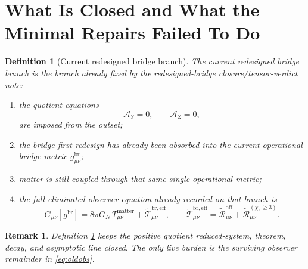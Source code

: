 \documentclass[11pt]{article}
\newcommand{\ReBridge}{g^{\mathrm{br}}}
\newcommand{\ReEff}{\widetilde{\mathcal T}_{\mu\nu}^{\mathrm{br,eff}}}
\newcommand{\ReLong}{\widetilde{\mathcal R}_{\mu\nu}^{(\chi,\ge 3)}}
\newcommand{\ReOff}{\widetilde{\mathcal R}_{\mu\nu}^{\mathrm{off}}}
\newcommand{\AY}{\mathcal A_Y}
\newcommand{\AZ}{\mathcal A_Z}
\newtheorem{definition}{Definition}
\newtheorem{remark}{Remark}
\begin{document}
\section{What Is Closed and What the Minimal Repairs Failed To Do}

\begin{definition}[Current redesigned bridge branch]
\label{def:current}
The \emph{current redesigned bridge branch} is the branch already fixed by the redesigned-bridge closure/tensor-verdict note:
\begin{enumerate}
    \item the quotient equations
    \begin{equation}
    \AY=0,
    \qquad
    \AZ=0,
    \label{eq:AYAZ}
    \end{equation}
    are imposed from the outset;
    \item the bridge-first redesign has already been absorbed into the current operational bridge metric \(\ReBridge_{\mu\nu}\);
    \item matter is still coupled through that same single operational metric;
    \item the full eliminated observer equation already recorded on that branch is
    \begin{equation}
    G_{\mu\nu}[\ReBridge]
    =
    8\pi G_N\,T_{\mu\nu}^{\mathrm{matter}}
    +\ReEff,
    \qquad
    \ReEff=\ReOff+\ReLong.
    \label{eq:oldobs}
    \end{equation}
\end{enumerate}
\end{definition}

\begin{remark}
Definition \ref{def:current} keeps the positive quotient reduced-system, theorem, decay, and asymptotic line closed. The only live burden is the surviving observer remainder in \eqref{eq:oldobs}.
\end{remark}
\end{document}
